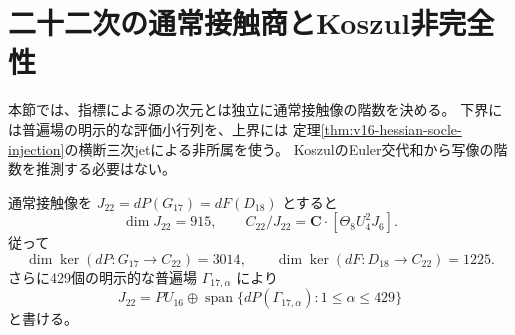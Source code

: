 

\section{二十二次の通常接触商とKoszul非完全性}
\label{sec:v16-contact-rank}

本節では、指標による源の次元とは独立に通常接触像の階数を決める。
下界には普遍場の明示的な評価小行列を、上界には
定理\ref{thm:v16-hessian-socle-injection}の横断三次jetによる非所属を使う。
KoszulのEuler交代和から写像の階数を推測する必要はない。

\begin{proposition}[二十二次の通常接触商]
\label{prop:v16-contact-rank-twenty-second}
通常接触像を $J_{22}=dP(G_{17})=dF(D_{18})$ とすると
\[
 \dim J_{22}=915,\qquad
 C_{22}/J_{22}=\mathbf C\cdot[\Theta_8U_4^2J_6].
\]
従って
\[
 \dim\ker(dP:G_{17}\to C_{22})=3014,\qquad
 \dim\ker(dF:D_{18}\to C_{22})=1225.
\]
さらに429個の明示的な普遍場 $\Gamma_{17,\alpha}$ により
\[
 J_{22}=P U_{16}\oplus
 \operatorname{span}\{dP(\Gamma_{17,\alpha}):1\leq\alpha\leq429\}
\]
と書ける。
\end{proposition}

